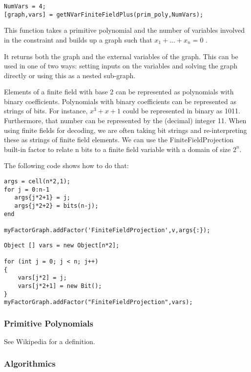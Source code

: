 \begin{lstlisting}
NumVars = 4;
[graph,vars] = getNVarFiniteFieldPlus(prim_poly,NumVars);
\end{lstlisting}

This function takes a primitive polynomial and the number of variables involved in the constraint and builds up a graph such that  $ x_1+...+x_n = 0 $ .

It returns both the graph and the external variables of the graph. This can be used in one of two ways: setting inputs on the variables and solving the graph directly or using this as a nested sub-graph.

\fi


Elements of a finite field with base 2 can be represented as polynomials with binary coefficients. Polynomials with binary coefficients can be represented as strings of bits. For instance, $x^3+x+1$ could be represented in binary as 1011. Furthermore, that number can be represented by the (decimal) integer 11. When using finite fields for decoding, we are often taking bit strings and re-interpreting these as strings of finite field elements. We can use the FiniteFieldProjection built-in factor to relate n bits to a finite field variable with a domain of size $2^n$.

The following code shows how to do that:

\ifmatlab
\begin{lstlisting}
args = cell(n*2,1);
for j = 0:n-1
   args{j*2+1} = j;
   args{j*2+2} = bits(n-j);
end

myFactorGraph.addFactor('FiniteFieldProjection',v,args{:});
\end{lstlisting}
\fi

\ifjava
\begin{lstlisting}
Object [] vars = new Object[n*2];
		
for (int j = 0; j < n; j++)
{
	vars[j*2] = j;
	vars[j*2+1] = new Bit();
}
myFactorGraph.addFactor("FiniteFieldProjection",vars);

\end{lstlisting}
\fi

\subsubsection{Primitive Polynomials}

See Wikipedia for a definition. 

\subsubsection{Algorithmics}


